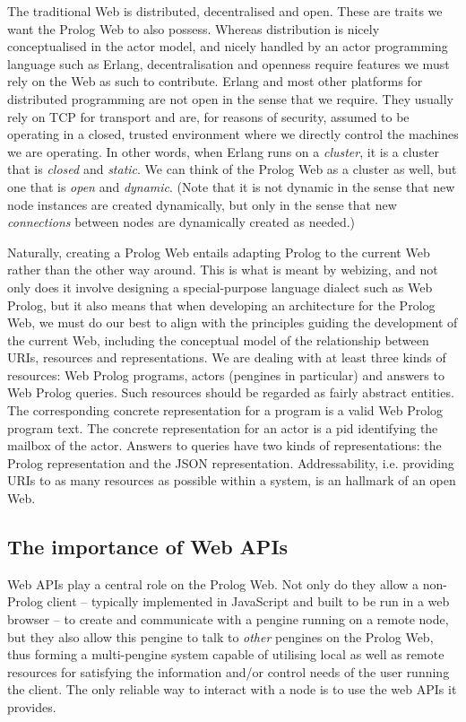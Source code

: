 \documentclass{tlp}
\begin{document}
The traditional Web is distributed, decentralised and open. These are traits we want the Prolog Web to also possess. Whereas distribution is nicely conceptualised in the actor model, and nicely handled by an actor programming language such as Erlang, decentralisation and openness require features we must rely on the Web as such to contribute. Erlang and most other platforms for distributed programming are not open in the sense that we require. They usually rely on TCP for transport and are, for reasons of security, assumed to be operating in a closed, trusted environment where we directly control the machines we are operating. In other words, when Erlang runs on a \textit{cluster}, it is a cluster that is \textit{closed} and \textit{static}. We can think of the Prolog Web as a cluster as well, but one that is \textit{open} and \textit{dynamic}. (Note that it is not dynamic in the sense that new node instances are created dynamically, but only in the sense that new \textit{connections} between nodes are dynamically created as needed.)

Naturally, creating a Prolog Web entails adapting Prolog to the current Web rather than the other way around. This is what is meant by webizing, and not only does it involve designing a special-purpose language dialect such as Web Prolog, but it also means that when developing an architecture for the Prolog Web, we must do our best to align with the principles guiding the development of the current Web, including the conceptual model of the relationship between URIs, resources and representations. We are dealing with at least three kinds of resources: Web Prolog programs, actors (pengines in particular) and answers to Web Prolog queries. Such resources should be regarded as fairly abstract entities. The corresponding concrete representation for a program is a valid Web Prolog program text. The concrete representation for an actor is a pid identifying the mailbox of the actor. Answers to queries have two kinds of representations: the Prolog representation and the JSON representation. Addressability, i.e. providing URIs to as many resources as possible within a system, is an hallmark of an open Web.


\subsection{The importance of Web APIs}

\noindent Web APIs play a central role on the Prolog Web. Not only do they allow a non-Prolog client -- typically implemented in JavaScript and built to be run in a web browser -- to create and communicate with a pengine running on a remote node, but they also allow this pengine to talk to \textit{other} pengines on the Prolog Web, thus forming a multi-pengine system capable of utilising local as well as remote resources for satisfying the information and/or control needs of the user running the client. The only reliable way to interact with a node is to use the web APIs it provides.
\end{document}
